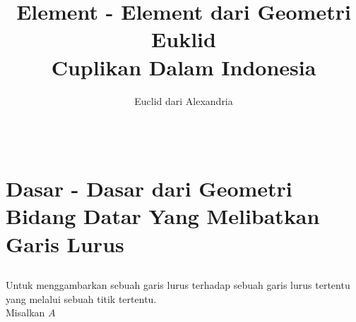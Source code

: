 \documentclass[a4paper, 12pt]{book}
\newcommand*{\sectionformat}{\centering}
\begin{document}
\title{\textbf{Element - Element dari Geometri Euklid\\
Cuplikan Dalam Indonesia}}
\author{Euclid dari Alexandria}
\maketitle
\setcounter{chapter}{1}
\chapter*{\centering \chaptername{ \thechapter}\\
Dasar - Dasar dari Geometri Bidang Datar Yang Melibatkan Garis Lurus}
\section*{\sectionformat }
Untuk menggambarkan sebuah garis lurus terhadap sebuah garis lurus tertentu yang melalui
sebuah titik tertentu.\\
Misalkan $A$
\end{document}
